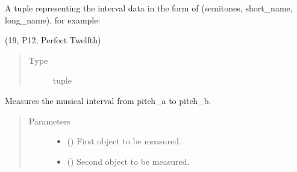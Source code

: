 \documentclass[letterpaper,10pt,english]{sphinxmanual}
\begin{document}
\begin{fulllineitems}
\begin{fulllineitems}
\label{\detokenize{birdears:birdears.interval.Interval.data}}
A tuple representing the interval data in the form of
(semitones, short\_name, long\_name), for example:

\begin{sphinxVerbatim}[commandchars=\\\{\}]
(19, \PYGZsq{}P12\PYGZsq{}, \PYGZsq{}Perfect Twelfth\PYGZsq{})
\end{sphinxVerbatim}
\begin{quote}\begin{description}
\item[{Type}] \leavevmode
tuple

\end{description}\end{quote}

\end{fulllineitems}


\begin{fulllineitems}
\label{\detokenize{birdears:birdears.interval.Interval.__init__}}
Measures the musical interval from pitch\_a to pitch\_b.
\begin{quote}\begin{description}
\item[{Parameters}] \leavevmode\begin{itemize}
\item {} 
 () \textendash{} First  object to be measured.

\item {} 
 () \textendash{} Second  object to be measured.

\end{itemize}

\end{description}\end{quote}

\end{fulllineitems}


\end{fulllineitems}
\end{document}
